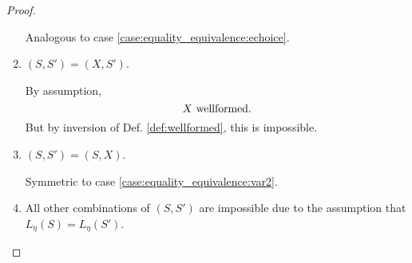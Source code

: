 \documentclass{llncs}
\newcommand*{\wf}[1]{\text{$#1$ {\normalfont \rmfamily wellformed}}}
\renewcommand*{\|}{\;|\;}
\begin{document}
\begin{proof}
\begin{enumerate}
      Analogous to case \ref{case:equality_equivalence:echoice}.

    \item
      \label{case:equality_equivalence:var1}
      $(S, S') = (X, S')$.

      By assumption,
      \begin{equation*}
        \wf{X}.
      \end{equation*}
      But by inversion of Def. \ref{def:wellformed}, this is impossible.

    \item
      \label{case:equality_equivalence:var2}
      $(S, S') = (S, X)$.

      Symmetric to case \ref{case:equality_equivalence:var2}.

    \item
      \label{case:equality_equivalence:other}
      All other combinations of $(S, S')$ are impossible due to the assumption
      that $L_\eta(S) = L_\eta(S')$.
  \end{enumerate}
\end{proof}
\end{document}
